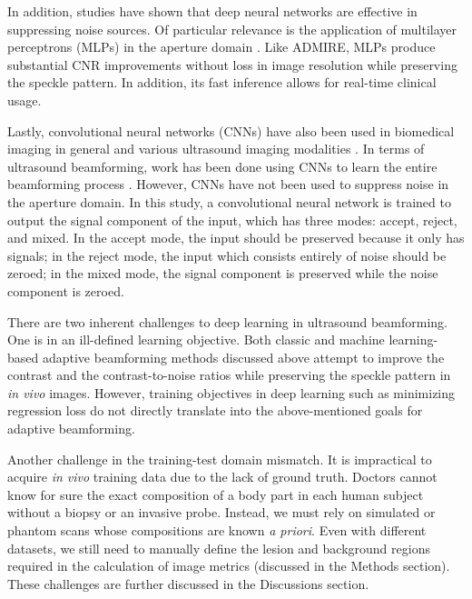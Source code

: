 In addition, studies have shown that deep neural networks are effective in suppressing noise sources. Of particular relevance is the application of multilayer perceptrons (MLPs) in the aperture domain \cite{luchies_tmi_2018, training_improvements}. Like ADMIRE, MLPs produce substantial CNR improvements without loss in image resolution while preserving the speckle pattern. In addition, its fast inference allows for real-time clinical usage.

Lastly, convolutional neural networks (CNNs) have also been used in biomedical imaging in general \cite{unet} and various ultrasound imaging modalities \cite{van_sloun_review}. In terms of ultrasound beamforming, work has been done using CNNs to learn the entire beamforming process \cite{hyun_uffc_2019}. However, CNNs have not been used to suppress noise in the aperture domain. In this study, a convolutional neural network is trained to output the signal component of the input, which has three modes: accept, reject, and mixed. In the accept mode, the input should be preserved because it only has signals; in the reject mode, the input which consists entirely of noise should be zeroed; in the mixed mode, the signal component is preserved while the noise component is zeroed.

There are two inherent challenges to deep learning in ultrasound beamforming. One is in an ill-defined learning objective. Both classic and machine learning-based adaptive beamforming methods discussed above attempt to improve the contrast and the contrast-to-noise ratios while preserving the speckle pattern in \textit{in vivo} images. However, training objectives in deep learning such as minimizing regression loss do not directly translate into the above-mentioned goals for adaptive beamforming.

Another challenge in the training-test domain mismatch. It is impractical to acquire \textit{in vivo} training data due to the lack of ground truth. Doctors cannot know for sure the exact composition of a body part in each human subject without a biopsy or an invasive probe. Instead, we must rely on simulated or phantom scans whose compositions are known \textit{a priori}. Even with different datasets, we still need to manually define the lesion and background regions required in the calculation of image metrics (discussed in the Methods section). These challenges are further discussed in the Discussions section.


